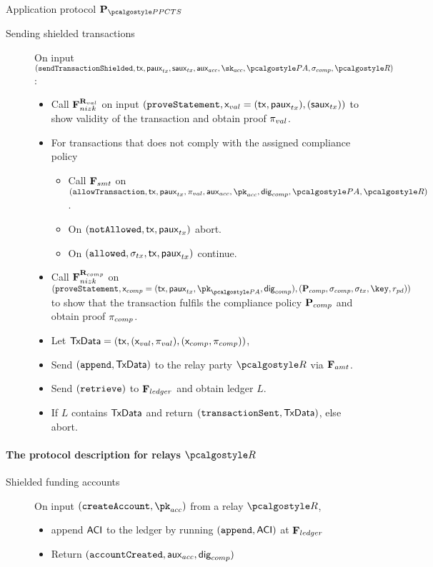 \documentclass[runningheads,10pt]{llncs}
\numberwithin{equation}{section}
\begin{document}
\begin{protbox}{Application protocol $\prot{\PPCTS}$}
\begin{description}
  \item[Sending shielded transactions] On input $(\sendTransactionShielded,  \tx, \pauxtx,
    \sauxtx, \auxacc, \skacc, \polas, \signature_{comp}, \relay)$:
    \begin{itemize}
    \item Call $\mathbf{F}_{{nizk}}^{\mathbf{R}_{val}}$ on input $(\mathtt{proveStatement},
      \mathsf{x}_{val} = (\mathsf{tx}, \mathsf{paux}_{tx}), (\mathsf{saux}_{tx}))$ to show validity of the
      transaction and obtain proof $\mathsf{\pi}_{val}$.
    \item For transactions that does not comply with the assigned compliance policy
      \begin{itemize}
      \item Call $\mathbf{F}_{{smt}}$ on
        $(\allowTransaction, \tx, \paux_{tx}, \zkproof_{val}, \auxacc, \pk_{acc}, \policydig, \polas,
        \relay)$.
      \item On $(\mathtt{notAllowed}, \mathsf{tx}, \mathsf{paux}_{tx})$ abort.
      \item On $(\mathtt{allowed}, \sigma_{tx}, \mathsf{tx}, \mathsf{paux}_{tx})$ continue.
      \end{itemize}
    \item Call $\mathbf{F}_{{nizk}}^{\mathbf{R}_{comp}}$ on
      $(\proveStatement, \inp_{comp} = (\tx, \paux_{tx}, \pk_{\polas}, \policydig),
      (\comppolicy, \signature_{comp}, \signature_{tx}, \key, r_{pd}))$ to show that
      the transaction fulfils the compliance policy $\mathbf{P}_{comp}$ and obtain proof
      $\mathsf{\pi}_{comp}$.
    \item Let
      $\mathsf{TxData} = (\mathsf{tx}, (\mathsf{x}_{val}, \mathsf{\pi}_{val}), (\mathsf{x}_{comp},
      \mathsf{\pi}_{comp}))$,
    \item Send $(\mathtt{append}, \mathsf{TxData})$ to the relay party $\relay$ via $\mathbf{F}_{{amt}}$.
    \item Send $(\mathtt{retrieve})$ to $\mathbf{F}_{{ledger}}$ and obtain ledger $L$.
    \item If $L$ contains $\mathsf{TxData}$ and return $(\mathtt{transactionSent}, \mathsf{TxData})$, else abort.
    \end{itemize}
  \end{description}

  \paragraph{The protocol description for relays $\relay$}
  \begin{description}
  \item[Shielded funding accounts] On input $(\createAccount, \pkacc)$ from a relay
    $\relay$,
    \begin{itemize}
    \item append $\mathsf{ACI}$ to the ledger by running $(\mathtt{append}, \mathsf{ACI})$ at
      $\mathbf{F}_{{ledger}}$
    \item Return $(\mathtt{accountCreated}, \mathsf{aux}_{acc}, \mathsf{dig}_{comp})$
    \end{itemize}
    

\end{description}
\end{protbox}
\end{document}
